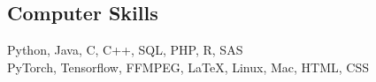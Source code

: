 \documentclass[10pt]{res} %
\begin{document}
\begin{resume}

\section{\large Computer Skills} 
Python, Java, C, C++, SQL, PHP, R, SAS \\
PyTorch, Tensorflow, FFMPEG, \LaTeX, Linux, Mac, HTML, CSS



\end{resume}
\end{document}
